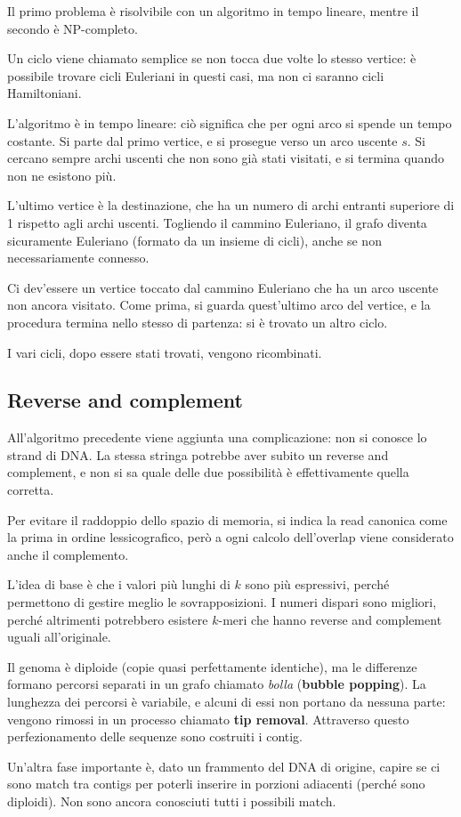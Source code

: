 Il primo problema è risolvibile con un algoritmo in tempo lineare, mentre il secondo è NP-completo. 

Un ciclo viene chiamato semplice se non tocca due volte lo stesso vertice: è possibile trovare cicli Euleriani in questi casi, ma non ci saranno cicli Hamiltoniani. 

L'algoritmo è in tempo lineare: ciò significa che per ogni arco si spende un tempo costante. Si parte dal primo vertice, e si prosegue verso un arco uscente $s$. Si cercano sempre archi uscenti che non sono già stati visitati, e si termina quando non ne esistono più.

L'ultimo vertice è la destinazione, che ha un numero di archi entranti superiore di 1 rispetto agli archi uscenti. Togliendo il cammino Euleriano, il grafo diventa sicuramente Euleriano (formato da un insieme di cicli), anche se non necessariamente connesso. 

Ci dev'essere un vertice toccato dal cammino Euleriano che ha un arco uscente non ancora visitato. Come prima, si guarda quest'ultimo arco del vertice, e la procedura termina nello stesso di partenza: si è trovato un altro ciclo. 

I vari cicli, dopo essere stati trovati, vengono ricombinati.

\subsection{Reverse and complement}
All'algoritmo precedente viene aggiunta una complicazione: non si conosce lo strand di DNA. La stessa stringa potrebbe aver subito un reverse and complement, e non si sa quale delle due possibilità è effettivamente quella corretta.

Per evitare il raddoppio dello spazio di memoria, si indica la read canonica come la prima in ordine lessicografico, però a ogni calcolo dell'overlap viene considerato anche il complemento.

L'idea di base è che i valori più lunghi di $k$ sono più espressivi, perché permettono di gestire meglio le sovrapposizioni. I numeri dispari sono migliori, perché altrimenti potrebbero esistere $k$-meri che hanno reverse and complement uguali all'originale. 

Il genoma è diploide (copie quasi perfettamente identiche), ma le differenze formano percorsi separati in un grafo chiamato \textit{bolla} (\textbf{bubble popping}). La lunghezza dei percorsi è variabile, e alcuni di essi non portano da nessuna parte: vengono rimossi in un processo chiamato \textbf{tip removal}. Attraverso questo perfezionamento delle sequenze sono costruiti i contig.

Un'altra fase importante è, dato un frammento del DNA di origine, capire se ci sono match tra contigs per poterli inserire in porzioni adiacenti (perché sono diploidi). Non sono ancora conosciuti tutti i possibili match.